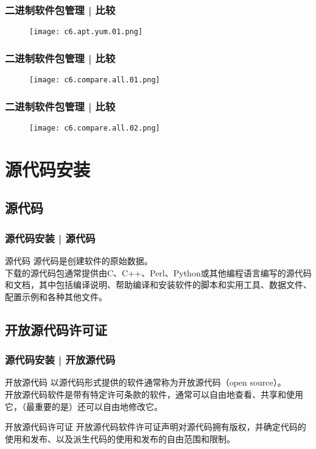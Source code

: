 \begin{frame}
  \frametitle{二进制软件包管理 | 比较}
  \begin{figure}
    \centering
    \texttt{[image: c6.apt.yum.01.png]}
  \end{figure}
\end{frame}

\begin{frame}
  \frametitle{二进制软件包管理 | 比较}
  \begin{figure}
    \centering
    \texttt{[image: c6.compare.all.01.png]}
  \end{figure}
\end{frame}

\begin{frame}
  \frametitle{二进制软件包管理 | 比较}
  \begin{figure}
    \centering
    \texttt{[image: c6.compare.all.02.png]}
  \end{figure}
\end{frame}

\section{源代码安装}
\subsection{源代码}
\begin{frame}
  \frametitle{源代码安装 | 源代码}
  \begin{block}{源代码}
    源代码是创建软件的原始数据。\\
    下载的源代码包通常提供由C、C++、Perl、Python或其他编程语言编写的源代码和文档，其中包括编译说明、帮助编译和安装软件的脚本和实用工具、数据文件、配置示例和各种其他文件。
  \end{block}
\end{frame}

\subsection{开放源代码许可证}
\begin{frame}
  \frametitle{源代码安装 | 开放源代码}
  \begin{block}{开放源代码}
    以源代码形式提供的软件通常称为开放源代码（open source）。\\
    开放源代码软件是带有特定许可条款的软件，通常可以自由地查看、共享和使用它，（最重要的是）还可以自由地修改它。
  \end{block}
  \pause
  \begin{block}{开放源代码许可证}
    开放源代码软件许可证声明对源代码拥有版权，并确定代码的使用和发布、以及派生代码的使用和发布的自由范围和限制。
  \end{block}
\end{frame}

